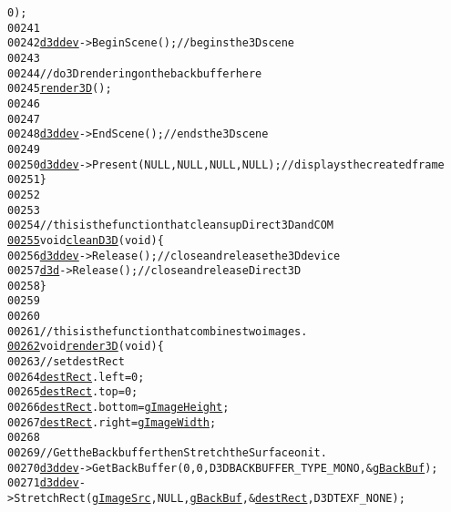 \begin{footnotesize}
\begin{alltt}
      0);
00241 
00242         \hyperlink{main_8cpp_a1c4528473f1127613d4edcaac0dad7f1}{d3ddev}->BeginScene();\textcolor{comment}{// begins the 3D scene}
00243 
00244         \textcolor{comment}{// do 3D rendering on the back buffer here}
00245         \hyperlink{main_8cpp_a94b4e3bf0d4387b63e1bc86968b6550d}{render3D}();
00246 
00247 
00248         \hyperlink{main_8cpp_a1c4528473f1127613d4edcaac0dad7f1}{d3ddev}->EndScene();\textcolor{comment}{// ends the 3D scene}
00249 
00250         \hyperlink{main_8cpp_a1c4528473f1127613d4edcaac0dad7f1}{d3ddev}->Present(NULL, NULL, NULL, NULL);\textcolor{comment}{// displays the created frame}
00251 \}
00252 
00253 
00254 \textcolor{comment}{// this is the function that cleans up Direct3D and COM}
\hypertarget{main_8cpp_source_l00255}{}\hyperlink{main_8cpp_a6e0493c83a486408dbfaae7812e6e47a}{00255} \textcolor{keywordtype}{void} \hyperlink{main_8cpp_a6e0493c83a486408dbfaae7812e6e47a}{cleanD3D}(\textcolor{keywordtype}{void}) \{
00256         \hyperlink{main_8cpp_a1c4528473f1127613d4edcaac0dad7f1}{d3ddev}->Release();\textcolor{comment}{// close and release the 3D device}
00257         \hyperlink{main_8cpp_aa8a3bb0b341846489cc307333d1d9811}{d3d}->Release();\textcolor{comment}{// close and release Direct3D}
00258 \}
00259 
00260 
00261 \textcolor{comment}{// this is the function that combines two images.}
\hypertarget{main_8cpp_source_l00262}{}\hyperlink{main_8cpp_a94b4e3bf0d4387b63e1bc86968b6550d}{00262} \textcolor{keywordtype}{void} \hyperlink{main_8cpp_a94b4e3bf0d4387b63e1bc86968b6550d}{render3D}(\textcolor{keywordtype}{void}) \{
00263         \textcolor{comment}{// set destRect}
00264         \hyperlink{main_8cpp_a908970643424027cd7df53bf68a9cdad}{destRect}.left = 0;
00265         \hyperlink{main_8cpp_a908970643424027cd7df53bf68a9cdad}{destRect}.top = 0;
00266         \hyperlink{main_8cpp_a908970643424027cd7df53bf68a9cdad}{destRect}.bottom = \hyperlink{config_8h_af737c15e6577f2676602957bc1ac2ab1}{gImageHeight};
00267         \hyperlink{main_8cpp_a908970643424027cd7df53bf68a9cdad}{destRect}.right = \hyperlink{config_8h_a5dde88e08c88df4ec4c201ab068a909b}{gImageWidth};
00268 
00269         \textcolor{comment}{// Get the Backbuffer then Stretch the Surface on it.}
00270         \hyperlink{main_8cpp_a1c4528473f1127613d4edcaac0dad7f1}{d3ddev}->GetBackBuffer(0, 0, D3DBACKBUFFER\_TYPE\_MONO, &\hyperlink{main_8cpp_a94593fcbf19d34c0830799636182170e}{gBackBuf});
00271         \hyperlink{main_8cpp_a1c4528473f1127613d4edcaac0dad7f1}{d3ddev}->StretchRect(\hyperlink{main_8cpp_a35944f88a0c5556a08bd1da88b8d89db}{gImageSrc}, NULL, \hyperlink{main_8cpp_a94593fcbf19d34c0830799636182170e}{gBackBuf}, &\hyperlink{main_8cpp_a908970643424027cd7df53bf68a9cdad}{destRect}, D3DTEXF\_NONE);

\end{alltt}
\end{footnotesize}
